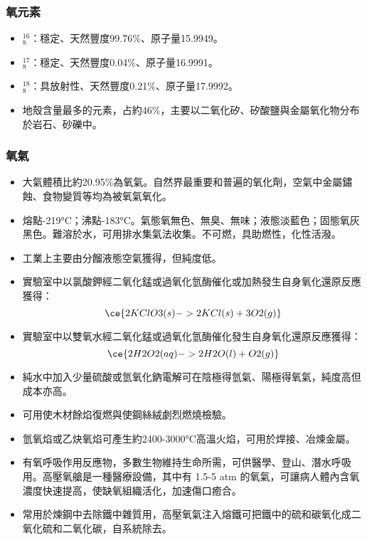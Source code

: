 \documentclass[a4paper,12pt]{report}
\begin{document}
\subsubsection{氧元素}
\begin{itemize}
\item $^{16}_8$\rmO：穩定、天然豐度99.76\%、原子量15.9949。
\item $^{17}_8$\rmO：穩定、天然豐度0.04\%、原子量16.9991。
\item $^{18}_8$\rmO：具放射性、天然豐度0.21\%、原子量17.9992。
\item 地殼含量最多的元素，占約46\%，主要以二氧化矽、矽酸鹽與金屬氧化物分布於岩石、砂礫中。
\end{itemize}
\subsubsection{氧氣}
\begin{itemize}
\item 大氣體積比約20.95\%為氧氣。自然界最重要和普遍的氧化劑，空氣中金屬鏽蝕、食物變質等均為被氧氣氧化。
\item 熔點-219°C；沸點-183°C。氣態氧無色、無臭、無味；液態淡藍色；固態氧灰黑色。難溶於水，可用排水集氣法收集。不可燃，具助燃性，化性活潑。
\item 工業上主要由分餾液態空氣獲得，但純度低。
\item 實驗室中以氯酸鉀經二氧化錳或過氧化氫酶催化或加熱發生自身氧化還原反應獲得：
\[\ce{2KClO3(s) -> 2KCl(s) + 3O2(g)}\]
\item 實驗室中以雙氧水經二氧化錳或過氧化氫酶催化發生自身氧化還原反應獲得：
\[\ce{2H2O2(aq) -> 2H2O(l) + O2(g)}\]
\item 純水中加入少量硫酸或氫氧化鈉電解可在陰極得氫氣、陽極得氧氣，純度高但成本亦高。
\item 可用使木材餘焰復燃與使鋼絲絨劇烈燃燒檢驗。
\item 氫氧焰或乙炔氧焰可產生約2400-3000°C高溫火焰，可用於焊接、冶煉金屬。
\item 有氧呼吸作用反應物，多數生物維持生命所需，可供醫學、登山、潛水呼吸用。高壓氧艙是一種醫療設備，其中有 1.5-5 atm 的氧氣，可讓病人體內含氧濃度快速提高，使缺氧組織活化，加速傷口癒合。
\item 常用於煉鋼中去除鐵中雜質用，高壓氧氣注入熔鐵可把鐵中的硫和碳氧化成二氧化硫和二氧化碳，自系統除去。
\end{itemize}
\end{document}
